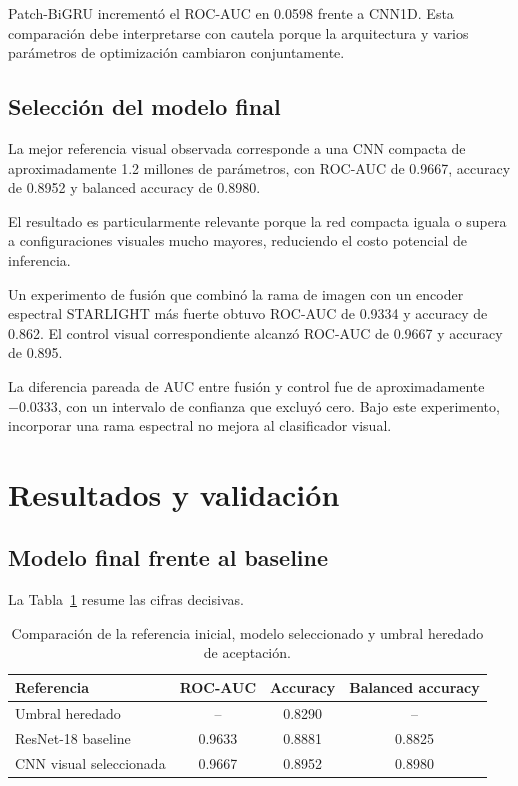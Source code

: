 \documentclass[letterpaper,11pt]{article}
\begin{document}
Patch-BiGRU incrementó el ROC-AUC en 0.0598 frente a CNN1D. Esta comparación debe interpretarse con cautela porque la arquitectura y varios parámetros de optimización cambiaron conjuntamente.

\subsection{Selección del modelo final} 

La mejor referencia visual observada corresponde a una CNN compacta de aproximadamente 1.2 millones de parámetros, con ROC-AUC de 0.9667, accuracy de 0.8952 y balanced accuracy de 0.8980. 

El resultado es particularmente relevante porque la red compacta iguala o supera a configuraciones visuales mucho mayores, reduciendo el costo potencial de inferencia. 

Un experimento de fusión que combinó la rama de imagen con un encoder espectral STARLIGHT más fuerte obtuvo ROC-AUC de 0.9334 y accuracy de 0.862. El control visual correspondiente alcanzó ROC-AUC de 0.9667 y accuracy de 0.895. 

La diferencia pareada de AUC entre fusión y control fue de aproximadamente $-0.0333$, con un intervalo de confianza que excluyó cero. Bajo este experimento, incorporar una rama espectral no mejora al clasificador visual.

\section{Resultados y validación} 
\subsection{Modelo final frente al baseline} 

La Tabla~\ref{tab:final} resume las cifras decisivas.

\begin{table}[H] 
  \centering 
  \caption{Comparación de la referencia inicial, modelo seleccionado y umbral heredado de aceptación.} 
  \label{tab:final}

  \begin{tabular}{lccc} 
    \toprule 
    Referencia & ROC-AUC & Accuracy & Balanced accuracy\\ 
    \midrule 
    Umbral heredado & -- & 0.8290 & --\\ 
    ResNet-18 baseline & 0.9633 & 0.8881 & 0.8825\\ 
    CNN visual seleccionada & 0.9667 & 0.8952 & 0.8980\\ 
    \bottomrule 
  \end{tabular}

\end{table}
\end{document}
